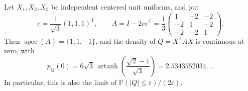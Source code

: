 \begin{proposition}\label{bench:householder}
Let \(X_1,X_2,X_3\) be independent centered unit uniforms, and put
\[
 e=\frac1{\sqrt3}(1,1,1)^{\mathsf T},\qquad
 A=I-2ee^{\mathsf T}
 =\frac13\begin{pmatrix}1&-2&-2\\-2&1&-2\\-2&-2&1\end{pmatrix}.
\]
Then \(\operatorname{spec}(A)=\{1,1,-1\}\), and the density of
\(Q=X^{\mathsf T}AX\) is continuous at zero, with
\begin{equation}\label{bench:householder-tip}
 p_Q(0)=6\sqrt3\,\operatorname{artanh}
              \left(\frac{\sqrt2-1}{\sqrt3}\right)
       =2.5343552034\ldots.
\end{equation}
In particular, this is also the limit of
\(\mathbb P(|Q|\leq\varepsilon)/(2\varepsilon)\).
\end{proposition}
